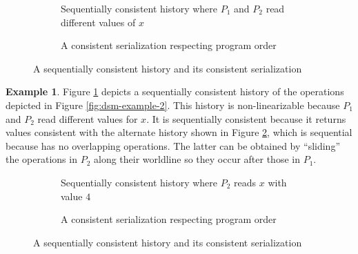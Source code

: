\documentclass[]             %
{NASA}                       %
\theoremstyle{definition}
\newtheorem{example}[theorem]{Example}
\begin{document}
\begin{figure}
  \begin{subfigure}{1\textwidth}
    \setlength\belowcaptionskip{4ex}
    \centering
    
    \caption{Sequentially consistent history where $P_1$ and $P_2$ read different values of $x$}
    \label{fig:dsm-example-2-sequential-1-sub}
  \end{subfigure}
  \begin{subfigure}{1\textwidth}
    
    \caption{A consistent serialization respecting program order}
    \label{fig:dsm-example-2-sequential-1-serial}
  \end{subfigure}
  \caption{A sequentially consistent history and its consistent serialization}
  \label{fig:dsm-example-2-sequential-1}
\end{figure}

\begin{example}
  \label{ex:dsm-example-2-sequential-1}
  Figure \ref{fig:dsm-example-2-sequential-1-sub} depicts a sequentially
  consistent history of the operations depicted in Figure
  \ref{fig:dsm-example-2}. This history is non-linearizable because
  $P_1$ and $P_2$ read different values for $x$. It is sequentially
  consistent because it returns values consistent with the alternate
  history shown in Figure \ref{fig:dsm-example-2-sequential-1-serial},
  which is sequential because has no overlapping operations. The
  latter can be obtained by ``sliding'' the operations in $P_2$ along
  their worldline so they occur after those in $P_1$.
\end{example}

\begin{figure}
  \begin{subfigure}{1\textwidth}
    \setlength\belowcaptionskip{4ex}
    \centering
    
    \caption{Sequentially consistent history where $P_2$ reads $x$ with value $4$}
    \label{fig:dsm-example-2-sequential-2-sub}
  \end{subfigure}
  \begin{subfigure}{1\textwidth}
    
    \caption{A consistent serialization respecting program order}
    \label{fig:dsm-example-2-sequential-2-serial}
  \end{subfigure}
  \caption{A sequentially consistent history and its consistent serialization}
  \label{fig:dsm-example-2-sequential-2}
\end{figure}
\end{document}
